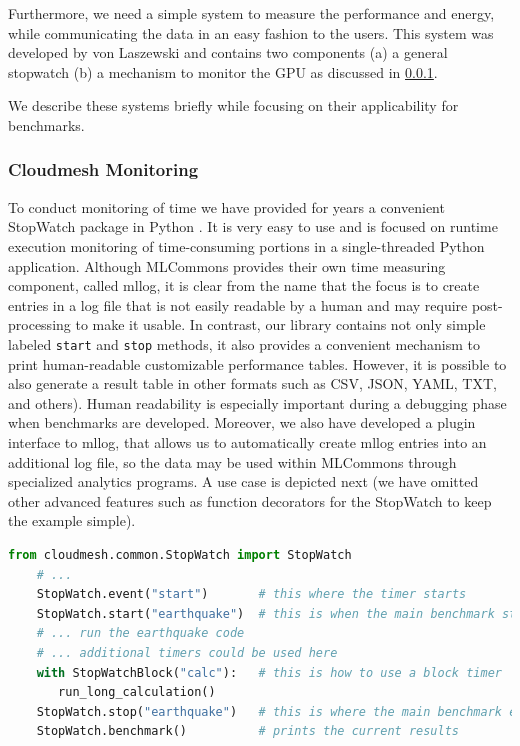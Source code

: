 Furthermore, we need a simple system to measure the performance and energy, while communicating the data in an easy fashion to the users. This system was developed by von Laszewski and contains two components (a) a general stopwatch (b) a mechanism to monitor the GPU as discussed in \ref{sec:monitoring}.

We describe these systems briefly while focusing on their applicability for benchmarks.

\subsubsection{Cloudmesh Monitoring}
\label{sec:monitoring}

To conduct monitoring of time we have provided for years a convenient StopWatch package in Python \citep{cloudmesh-stopwatch}.  It is very easy to use and is focused on runtime execution monitoring of time-consuming portions in a single-threaded Python application. Although MLCommons provides their own time measuring component, called mllog, it is clear from the name that the focus is to create entries in a log file that is not easily readable by a human and may require post-processing to make it usable. In contrast, our library contains not only simple labeled \texttt{start} and \texttt{stop} methods, it also provides a convenient mechanism to print human-readable customizable performance tables. However, it is possible to also generate a result table in other formats such as CSV, JSON, YAML, TXT, and others).  Human readability is especially important during a debugging phase when benchmarks are developed. Moreover, we also have developed a plugin interface to mllog, that allows us to automatically create mllog entries into an additional log file, so the data may be used within MLCommons through specialized analytics programs. A use case is depicted next (we have omitted other advanced features such as function decorators for the StopWatch to keep the example simple).



\begin{lstlisting}[language=Python]
    from cloudmesh.common.StopWatch import StopWatch 
    # ...
    StopWatch.event("start")       # this where the timer starts
    StopWatch.start("earthquake")  # this is when the main benchmark starts
    # ... run the earthquake code
    # ... additional timers could be used here
    with StopWatchBlock("calc"):   # this is how to use a block timer
       run_long_calculation()
    StopWatch.stop("earthquake")   # this is where the main benchmark ends
    StopWatch.benchmark()          # prints the current results
\end{lstlisting}

